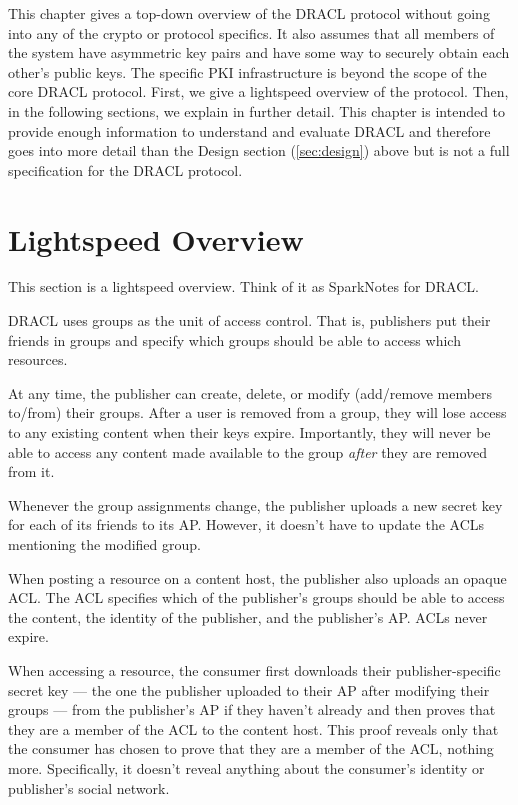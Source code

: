 \documentclass[pdftex,12pt,a4papaer]{report}
\begin{document}
This chapter gives a top-down overview of the DRACL protocol without going into
any of the crypto or protocol specifics. It also assumes that all members of the
system have asymmetric key pairs and have some way to securely obtain each
other's public keys. The specific PKI infrastructure is beyond the scope of the
core DRACL protocol. First, we give a lightspeed overview of the protocol. Then,
in the following sections, we explain in further detail. This chapter is
intended to provide enough information to understand and evaluate DRACL and
therefore goes into more detail than the Design section (\ref{sec:design}) above
but is not a full specification for the DRACL protocol.

\section{Lightspeed Overview}

This section is a lightspeed overview. Think of it as SparkNotes\texttrademark{}
for DRACL.

DRACL uses groups as the unit of access control. That is, publishers put their
friends in groups and specify which groups should be able to access which
resources.

At any time, the publisher can create, delete, or modify (add/remove members
to/from) their groups. After a user is removed from a group, they will lose
access to any existing content when their keys expire. Importantly, they will
never be able to access any content made available to the group \emph{after}
they are removed from it.
  
Whenever the group assignments change, the publisher uploads a new secret key
for each of its friends to its AP. However, it doesn't have to update the ACLs
mentioning the modified group.
  
When posting a resource on a content host, the publisher also uploads an opaque
ACL. The ACL specifies which of the publisher's groups should be able to access
the content, the identity of the publisher, and the publisher's AP. ACLs never
expire.
  
When accessing a resource, the consumer first downloads their publisher-specific
secret key --- the one the publisher uploaded to their AP after modifying their
groups --- from the publisher's AP if they haven't already and then proves that
they are a member of the ACL to the content host. This proof reveals only that
the consumer has chosen to prove that they are a member of the ACL, nothing
more. Specifically, it doesn't reveal anything about the consumer's identity or
publisher's social network.
  
\end{document}
